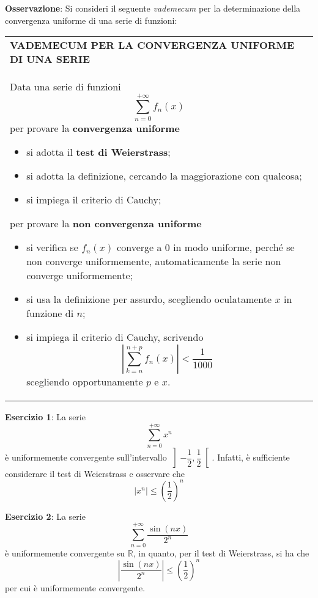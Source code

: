 \documentclass[a4paper]{extarticle}
\renewcommand\arraystretch{}
\begin{document}
\vspace{2em}
\noindent
\textbf{Osservazione}: Si consideri il seguente \textit{vademecum} per la determinazione della convergenza uniforme di una serie di funzioni:

\vspace{1em}
\setlength{\tabcolsep}{14pt}
\renewcommand{\arraystretch}{2}
\noindent
\begin{tabularx}{\textwidth}{@{}|P|@{}}
    \hline
    {\textbf{VADEMECUM PER LA CONVERGENZA UNIFORME DI UNA SERIE}}\\
    \parbox{\linewidth}{Data una serie di funzioni
    \[\sum_{n=0}^{+\infty} f_n(x)\]
    per provare la \textbf{convergenza uniforme}
        \begin{itemize}
            \item si adotta il \textbf{test di Weierstrass};
            \item si adotta la definizione, cercando la maggiorazione con qualcosa;
            \item si impiega il criterio di Cauchy;
        \end{itemize}
    per provare la \textbf{non convergenza uniforme}
        \begin{itemize}
            \item si verifica se $f_n(x)$ converge a $0$ in modo uniforme, perché se non converge uniformemente, automaticamente la serie non converge uniformemente;
            \item si usa la definizione per assurdo, scegliendo oculatamente $x$ in funzione di $n$;
            \item si impiega il criterio di Cauchy, scrivendo
            \[\left \vert \sum_{k=n}^{n+p} f_n(x) \right \vert < \frac{1}{1000}\]
            scegliendo opportunamente $p$ e $x$.
        \end{itemize}
    \vspace{1mm}}\\
    \hline
\end{tabularx}

\vspace{2Em}
\noindent
\textbf{Esercizio 1}: La serie
\[\sum_{n=0}^{+\infty} x^n\]
è uniformemente convergente sull'intervallo $\left] - \dfrac{1}{2}, \dfrac{1}{2}\right[$. Infatti, è sufficiente considerare il test di Weierstrass e osservare che
\[\left \vert x^n \right \vert \leq \left(\frac{1}{2}\right)^n\]

\vspace{1em}
\noindent
\textbf{Esercizio 2}: La serie
\[\sum_{n=0}^{+\infty} \frac{\sin(nx)}{2^n}\]
è uniformemente convergente su $\mathbb{R}$, in quanto, per il test di Weierstrass, si ha che
\[\left \vert \frac{\sin(nx)}{2^n} \right \vert \leq \left(\frac{1}{2}\right)^n\]
per cui è uniformemente convergente.
\end{document}
